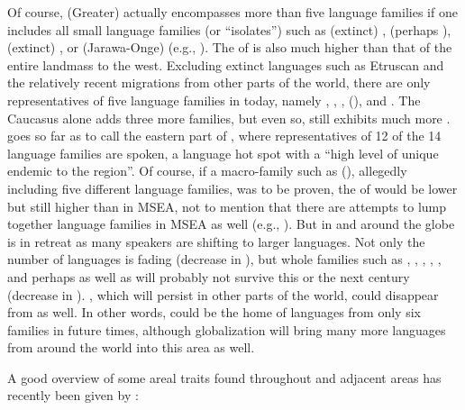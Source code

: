 Of course, (Greater)  actually encompasses more than five language families if one includes all small language families (or “isolates”) such as (extinct) ,  (perhaps ), (extinct) , or  (Jarawa-Onge) (e.g., \citealt{Hammarström2016}). The  of  is also much higher than that of the entire landmass to the west. Excluding extinct languages such as Etruscan and the relatively recent migrations from other parts of the world, there are only representatives of five language families in  today, namely , , ,  (), and . The Caucasus alone adds three more families, but even so,  still exhibits much more . \citet[137]{Anderson2010} goes so far as to call the eastern part of , where representatives of 12 of the 14 language families are spoken, a language hot spot with a “high level of unique   endemic to the region”. Of course, if a macro-family such as  (\citealt{Robbeets2015}), allegedly including five different language families, was to be proven, the  of  would be lower but still higher than in MSEA, not to mention that there are attempts to lump together language families in MSEA as well (e.g., \citealt{Sagart2016}). But  in  and around the globe is in retreat as many speakers are shifting to larger languages. Not only the number of languages is fading (decrease in ), but whole families such as , , , , , and perhaps  as well as  will probably not survive this or the next century (decrease in ). , which will persist in other parts of the world, could disappear from  as well. In other words,  could be the home of languages from only six families in future times, although globalization will bring many more languages from around the world into this area as well.

A good overview of some areal traits found throughout  and adjacent areas has recently been given by \citet[366]{Nichols2010}:

